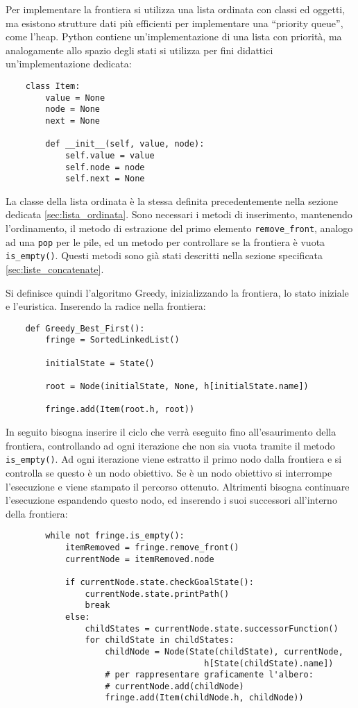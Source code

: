 \documentclass{article}
\numberwithin{equation}{subsection}
\begin{document}
Per implementare la frontiera si utilizza una lista ordinata con classi ed oggetti, ma esistono 
strutture dati più efficienti per implementare una ``priority queue'', come l'heap. Python 
contiene un'implementazione di una lista con priorità, ma analogamente allo spazio degli stati 
si utilizza per fini didattici un'implementazione dedicata:
\begin{verbatim}
    class Item:
        value = None
        node = None
        next = None

        def __init__(self, value, node):
            self.value = value
            self.node = node
            self.next = None
\end{verbatim}

La classe della lista ordinata è la stessa definita precedentemente nella sezione 
dedicata \ref{sec:lista_ordinata}. 
Sono necessari i metodi di inserimento, mantenendo l'ordinamento, il metodo di 
estrazione del primo elemento \verb|remove_front|, analogo ad una \verb|pop| per le pile, 
ed un metodo per controllare se la frontiera è vuota \verb|is_empty()|. Questi metodi sono già stati descritti nella sezione specificata 
\ref{sec:liste_concatenate}. 


Si definisce quindi l'algoritmo Greedy, inizializzando la frontiera, lo stato iniziale e 
l'euristica. Inserendo la radice nella frontiera:
\begin{verbatim}
    def Greedy_Best_First():
        fringe = SortedLinkedList() 

        initialState = State()
        
        root = Node(initialState, None, h[initialState.name])

        fringe.add(Item(root.h, root))
\end{verbatim}

In seguito bisogna inserire il ciclo che verrà eseguito fino all'esaurimento della frontiera, 
controllando ad ogni iterazione che non sia vuota tramite il metodo \verb|is_empty()|. 
Ad ogni iterazione viene estratto il primo nodo dalla frontiera e si controlla se questo è 
un nodo obiettivo. Se è un nodo obiettivo si interrompe l'esecuzione e viene stampato il 
percorso ottenuto. 
Altrimenti bisogna continuare l'esecuzione espandendo questo nodo, ed inserendo i suoi 
successori all'interno della frontiera:

\begin{verbatim}
        while not fringe.is_empty():
            itemRemoved = fringe.remove_front()
            currentNode = itemRemoved.node

            if currentNode.state.checkGoalState():
                currentNode.state.printPath()
                break
            else: 
                childStates = currentNode.state.successorFunction()
                for childState in childStates:
                    childNode = Node(State(childState), currentNode, 
                                        h[State(childState).name])
                    # per rappresentare graficamente l'albero:
                    # currentNode.add(childNode) 
                    fringe.add(Item(childNode.h, childNode))
\end{verbatim}
\end{document}
